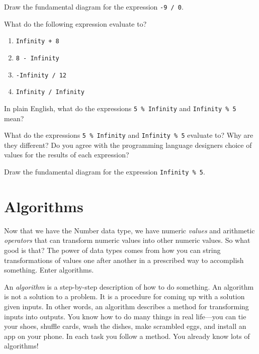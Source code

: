 \begin{question}
  Draw the fundamental diagram for the expression \texttt{-9 / 0}.
\end{question}

\begin{question}
  What do the following expression evaluate to?
  \begin{enumerate}
    \item \texttt{Infinity + 8}
    \item \texttt{8 - Infinity}
    \item \texttt{-Infinity / 12}
    \item \texttt{Infinity / Infinity}
  \end{enumerate}
\end{question}

\begin{question}
  In plain English, what do the expressions \texttt{5 \% Infinity} and \texttt{Infinity \% 5} mean?
\end{question}

\begin{question}
  What do the expressions \texttt{5 \% Infinity} and \texttt{Infinity \% 5} evaluate to? Why are they different? Do you agree with the programming language designers choice of values for the results of each expression?
\end{question}

\begin{question}
  Draw the fundamental diagram for the expression \texttt{Infinity \% 5}.
\end{question}


\section{Algorithms}

Now that we have the \textsf{Number} data type, we have numeric \emph{values} and arithmetic \emph{operators} that can transform numeric values into other numeric values. So what good is that? The power of data types comes from how you can string transformations of values one after another in a prescribed way to accomplish something. Enter algorithms.

An \emph{algorithm} is a step-by-step description of how to do something. An algorithm is not a solution to a problem. It is a procedure for coming up with a solution given inputs. In other words, an algorithm describes a method for transforming inputs into outputs. You know how to do many things in real life---you can tie your shoes, shuffle cards, wash the dishes, make scrambled eggs, and install an app on your phone. In each task you follow a method. You already know lots of algorithms!

